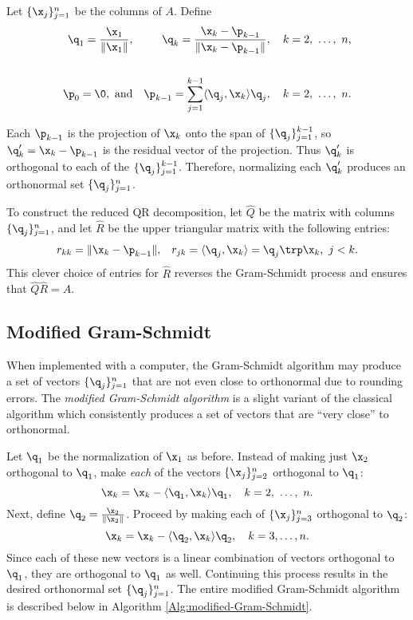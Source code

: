 Let $\{\x_j\}_{j=1}^n$ be the columns of $A$.
Define
%
\begin{align*}
\q_1 = \frac{\x_1}{\|\x_1\|},
&&
\q_{k} = \frac{\x_k - \p_{k-1}}{\|\x_k - \p_{k-1}\|},\quad k=2,\ \ldots,\ n,
\\ \\
\p_0 = \0,\ \text{and}
&&
\p_{k-1} = \sum_{j=1}^{k-1} \langle \q_j, \x_k\rangle \q_j,\quad k=2,\ \ldots,\ n.
\end{align*}

Each $\p_{k-1}$ is the projection of $\x_k$ onto the span of $\{\q_j\}_{j=1}^{k-1}$, so $\q_k' = \x_k - \p_{k-1}$ is the residual vector of the projection.
Thus $\q_k'$ is orthogonal to each of the $\{\q_j\}_{j=1}^{k-1}$.
Therefore, normalizing each $\q_k'$ produces an orthonormal set $\{\q_j\}_{j=1}^n$.

To construct the reduced QR decomposition, let $\widehat{Q}$ be the matrix with columns $\{\q_j\}_{j=1}^n$, and let $\widehat{R}$ be the upper triangular matrix with the following entries:
%
\begin{align*}
r_{kk} = \|\x_k-\p_{k-1}\|,
&&
r_{jk} = \langle \q_j, \x_k\rangle = \q_j\trp\x_k,\ j < k.
\end{align*}
%
This clever choice of entries for $\widehat{R}$ reverses the Gram-Schmidt process and ensures that $\widehat{Q}\widehat{R} = A$.

\begin{comment}
To construct the full QR decomposition, choose $m - n$ vectors $\{\x_j\}_{j=n+1}^m$ such that the entire set of original vectors $\{\x_j\}_{j=1}^m$ is linearly independent, then continue the Gram-Schmidt process to produce the additional columns of $Q$.
Appending $m - n$ rows of zeros to $\widehat{R}$ results in $R$.
\end{comment}

\subsection*{Modified Gram-Schmidt} %

When implemented with a computer, the Gram-Schmidt algorithm may produce a set of vectors $\{\q_j\}_{j=1}^n$ that are not even close to orthonormal due to rounding errors.
The \emph{modified Gram-Schmidt algorithm} is a slight variant of the classical algorithm which consistently produces a set of vectors that are ``very close'' to orthonormal.

Let $\q_1$ be the normalization of $\x_1$ as before.
Instead of making just $\x_2$ orthogonal to $\q_1$, make \emph{each} of the vectors $\{\x_j\}_{j=2}^n$ orthogonal to $\q_1$:
\[\x_k = \x_k - \langle \q_1,\x_{k} \rangle \q_1,\quad k=2,\ \ldots,\ n.\]
Next, define $\q_2 = \frac{\x_2}{\|\x_2\|}$.
Proceed by making each of $\{\x_j\}_{j=3}^n$ orthogonal to $\q_2$:
\[\x_k = \x_k - \langle \q_2,\x_{k} \rangle \q_2,\quad k=3,\ldots,n.\]
Since each of these new vectors is a linear combination of vectors orthogonal to $\q_1$, they are orthogonal to $\q_1$ as well.
Continuing this process results in the desired orthonormal set $\{\q_j\}_{j=1}^n$.
The entire modified Gram-Schmidt algorithm is described below in Algorithm \ref{Alg:modified-Gram-Schmidt}.

